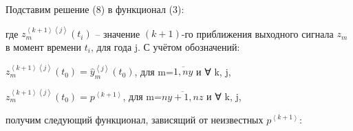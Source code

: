 Подставим решение (8) в функционал (3):


где
\(z_{m}^{\left\langle k + 1 \right\rangle\left\langle j \right\rangle}(t_{i})\)
-- значение \((k + 1)\)-го приближения выходного сигнала \(z_{m}\) в
момент времени \(t_{i}\), для года j. С учётом обозначений:

\(z_{m}^{\left\langle k + 1 \right\rangle\left\langle j \right\rangle}\left( t_{0} \right) = {\widehat{y}}_{m}^{\left\langle j \right\rangle}(t_{0})\),
для m=\(\overline{1,ny}\) и ∀ k, j,

\(z_{m}^{\left\langle k + 1 \right\rangle\left\langle j \right\rangle}\left( t_{0} \right) = p^{\left\langle k + 1 \right\rangle}\),
для m=\(\overline{ny + 1,nz}\) и ∀ k, j,

получим следующий функционал, зависящий от неизвестных
\(p^{\left\langle k + 1 \right\rangle}\):

